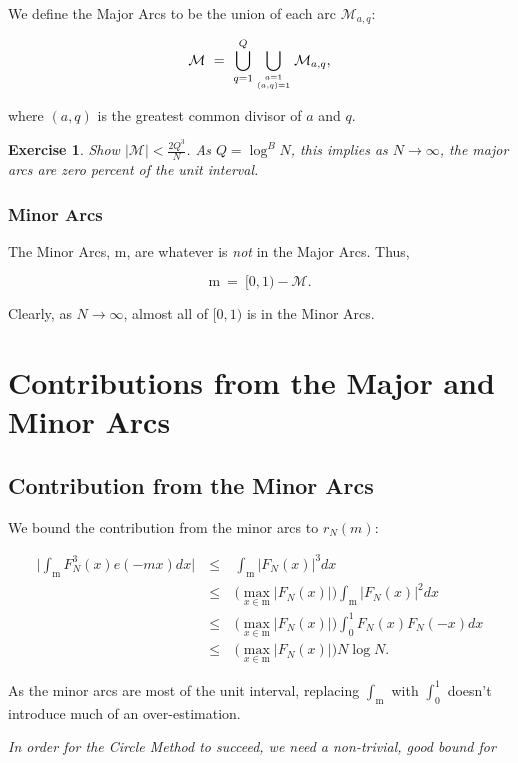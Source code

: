 \documentclass[12pt,letterpaper]{report}
\newcommand\be{\begin{equation}}
\newcommand\ee{\end{equation}}
\newcommand\bea{\begin{eqnarray}}
\newcommand\eea{\end{eqnarray}}
\newtheorem{exe}[thm]{Exercise}
\begin{document}
We define the Major Arcs to be the union of each arc
$\mathcal{M}_{a,q}$:

\be \mathcal{M} \ = \ \bigcup_{q=1}^Q \bigcup_{ {a = 1} \atop
{(a,q) = 1} } \mathcal{M}_{a,q}, \ee

where $(a,q)$ is the greatest common divisor of $a$ and $q$.

\begin{exe} Show $|\mathcal{M}| < \frac{2Q^3}{N}$. As $Q = \log^B
N$, this implies as $N \to \infty$, the major arcs are zero
percent of the unit interval. \end{exe}

\subsubsection{Minor Arcs}

The Minor Arcs, $\mathrm{m}$, are whatever is \emph{not} in the
Major Arcs. Thus,

\be \mathrm{m} \ = \ [0,1) - \mathcal{M}. \ee

Clearly, as $N \to \infty$, almost all of $[0,1)$ is in the Minor
Arcs.


\section{Contributions from the Major and Minor Arcs}


\subsection{Contribution from the Minor Arcs}

We bound the contribution from the minor arcs to $r_N(m)$:

\bea \Big| \int_{\mathrm{m}} F_N^3(x) e(-mx)dx \Big| & \ \le \ &
\int_{\mathrm{m}} |F_N(x)|^3 dx \nonumber\\ & \ \le \ & \Big(
\max_{x \in \mathrm{m} } |F_N(x)| \Big) \int_{\mathrm{m}}
|F_N(x)|^2 dx \nonumber\\ & \ \le \ & \Big( \max_{x \in \mathrm{m}
} |F_N(x)| \Big)  \int_0^1 F_N(x) F_N(-x) dx \nonumber\\ & \ \le \
& \Big( \max_{x \in \mathrm{m} } |F_N(x)| \Big) N \log N. \eea

As the minor arcs are most of the unit interval, replacing
$\int_{\mathrm{m}}$ with $\int_0^1$ doesn't introduce much of an
over-estimation.

\emph{In order for the Circle Method to succeed, we need a
non-trivial, good bound for}
\end{document}
